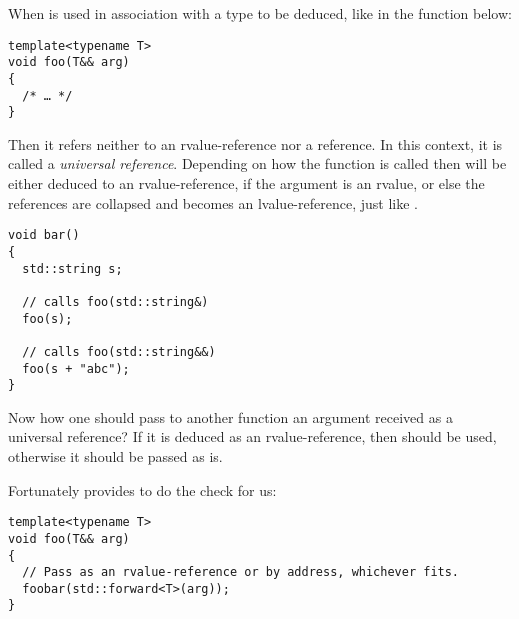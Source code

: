 When \code{\&\&} is used in association with a type to be deduced,
like in the function below:

\begin{lstlisting}
template<typename T>
void foo(T&& arg)
{
  /* … */
}
\end{lstlisting}

Then it refers neither to an rvalue-reference nor a reference. In this
context, it is called a \emph{universal reference}. Depending on how
the function is called then  will be either deduced to an
rvalue-reference, if the argument is an rvalue, or else the references
are collapsed and  becomes an lvalue-reference, just like
.

\begin{lstlisting}
void bar()
{
  std::string s;

  // calls foo(std::string&)
  foo(s);

  // calls foo(std::string&&)
  foo(s + "abc");
}
\end{lstlisting}

Now how one should pass to another function an argument received as a
universal reference? If it is deduced as an rvalue-reference, then
 should be used, otherwise it should be passed as
is.

%
%
Fortunately  provides  to do the check for
us:

\begin{lstlisting}
template<typename T>
void foo(T&& arg)
{
  // Pass as an rvalue-reference or by address, whichever fits.
  foobar(std::forward<T>(arg));
}
\end{lstlisting}

